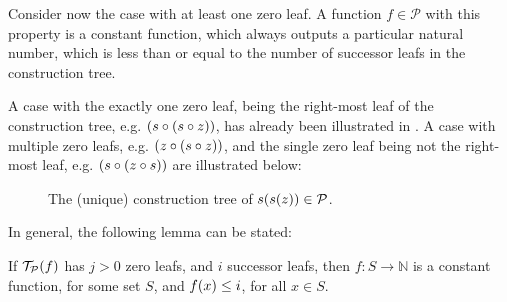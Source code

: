Consider now the case with at least one zero leaf. A function $f \in
\mathcal{P}$ with this property is a constant function, which always outputs a
particular natural number, which is less than or equal to the number of
successor leafs in the construction tree.

A case with the exactly one zero leaf, being the right-most leaf of the
construction tree, e.g. ${\mathopen{}\left({s \circ {\ensuremath{\mathopen{}\left({s \circ z}\right)\mathclose{}}}}\right)\mathclose{}}$, has already been
illustrated in . A case with multiple zero leafs, e.g.  ${\mathopen{}\left({z
\circ {\ensuremath{\mathopen{}\left({s \circ z}\right)\mathclose{}}}}\right)\mathclose{}}$, and the single zero leaf being not the right-most leaf,
e.g. ${\mathopen{}\left({s \circ {\ensuremath{\mathopen{}\left({z \circ s}\right)\mathclose{}}}}\right)\mathclose{}}$ are illustrated below:

\begin{figure}[h!]
\centering
%
\begin{subfigure}{0.49\textwidth}
\centering
{}
\end{subfigure}
%
\begin{subfigure}{0.49\textwidth}
\centering
{}
\end{subfigure}
%
\caption[]{The (unique) construction tree of $s{\mathopen{}\left({s{\mathopen{}\left({z}\right)\mathclose{}}}\right)\mathclose{}} \in \mathcal{P}$.}
\label{figure:fancy-zero-leafs}
\end{figure}

In general, the following lemma can be stated:

\begin{lemma} \label{lem:p-at-least-one-zero} If $\mathcal{T}_\mathcal{P}{\mathopen{}\left({f}\right)\mathclose{}}$
has $j > 0$ zero leafs, and $i$ successor leafs, then $f : S \rightarrow
\mathbb{N}$ is a constant function, for some set $S$, and $f{\mathopen{}\left({x}\right)\mathclose{}} \leq i$, for
all $x \in S$.  \end{lemma}


